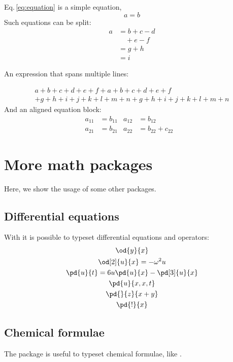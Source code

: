 Eq.\,\ref{eq:equation} is a simple equation,
\begin{equation}\label{eq:equation}
	a = b
\end{equation}
Such equations can be split:
\begin{equation}
	\begin{split}
		a& = b+c-d\\
		& \quad + e - f\\
		& = g+h\\
		& = i
	\end{split}
\end{equation}

An expression that spans multiple lines:

\begin{multline}
	a + b + c +d + e + f + a + b + c +d + e + f \\
	+ g + h + i + j + k + l + m + n+ g + h + i + j + k + l + m + n
\end{multline}
And an aligned equation block:
\begin{align}
	a_{11} & = b_{11}          &
	a_{12} & = b_{12}          & \\
	a_{21} & = b_{21}          &
	a_{22} & = b_{22} + c_{22}
\end{align}

\section{More math packages}
Here, we show the usage of some other packages.
\subsection{Differential equations}
With  it is possible to typeset differential equations and operators:
\begin{gather}
	\od{y}{x}\\
	\od[2]{u}{x} = -\omega^2 u\\
	\pd{u}{t} = 6u \pd{u}{x} - \pd[3]{u}{x}\\
	\pd{u}{x,x,t}\\
	\pd{}{z}{x+y}\\
	\pd{!}{x}
\end{gather}

\subsection{Chemical formulae}
The package  is useful to typeset chemical formulae, like .

